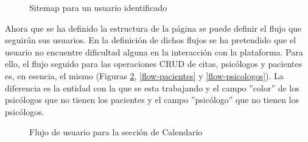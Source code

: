 \begin{figure}[H]
    \caption{Sitemap para un usuario identificado}
    \label{sitemap-identificado}
\end{figure}

Ahora que se ha definido la estructura de la página se puede definir el flujo que seguirán sus usuarios. En la definición de dichos flujos se ha pretendido que el usuario no encuentre dificultad alguna en la interacción con la plataforma. Para ello, el flujo seguido para las operaciones CRUD de citas, psicólogos y pacientes es, en esencia, el mismo (Figuras \ref{flow-calendario}, \ref{flow-pacientes} y \ref{flow-psicologos}). La diferencia es la entidad con la que se esta trabajando y el campo ''color'' de los psicólogos que no tienen los pacientes y el campo ''psicólogo'' que no tienen los psicólogos.

\begin{figure}[H]
    \caption{Flujo de usuario para la sección de Calendario}
    \label{flow-calendario}
\end{figure}

